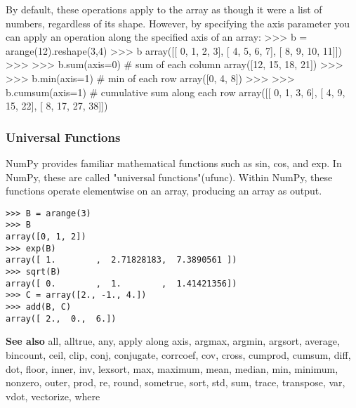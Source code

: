 By default, these operations apply to the array as though it were a list of numbers, regardless of its shape. However, by specifying the axis parameter you can apply an operation along the specified axis of an array:
>>> b = arange(12).reshape(3,4)
>>> b
array([[ 0,  1,  2,  3],
       [ 4,  5,  6,  7],
       [ 8,  9, 10, 11]])
>>>
>>> b.sum(axis=0)                            # sum of each column
array([12, 15, 18, 21])
>>>
>>> b.min(axis=1)                            # min of each row
array([0, 4, 8])
>>>
>>> b.cumsum(axis=1)                         # cumulative sum along each row
array([[ 0,  1,  3,  6],
       [ 4,  9, 15, 22],
       [ 8, 17, 27, 38]])
\subsubsection{Universal Functions}
NumPy provides familiar mathematical functions such as sin, cos, and exp. In NumPy, these are called "universal functions"(ufunc). Within NumPy, these functions operate elementwise on an array, producing an array as output.
\begin{verbatim}
>>> B = arange(3)
>>> B
array([0, 1, 2])
>>> exp(B)
array([ 1.        ,  2.71828183,  7.3890561 ])
>>> sqrt(B)
array([ 0.        ,  1.        ,  1.41421356])
>>> C = array([2., -1., 4.])
>>> add(B, C)
array([ 2.,  0.,  6.])
\end{verbatim}

\textbf{See also}\newline
all, alltrue, any, apply along axis, argmax, argmin, argsort, average, bincount, ceil, clip, conj, conjugate, corrcoef, cov, cross, cumprod, cumsum, diff, dot, floor, inner, inv, lexsort, max, maximum, mean, median, min, minimum, nonzero, outer, prod, re, round, sometrue, sort, std, sum, trace, transpose, var, vdot, vectorize, where
